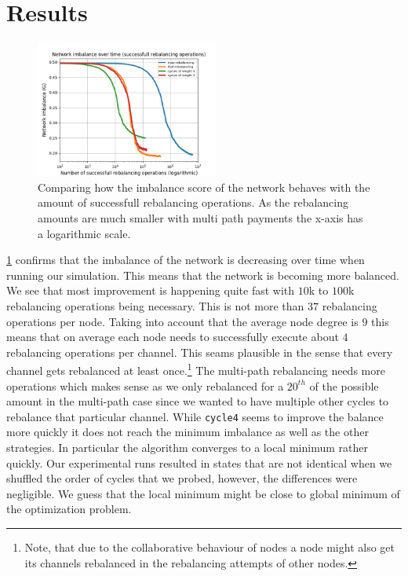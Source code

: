 \documentclass[conference]{IEEEtran}
\begin{document}
\section{Results}
\label{sec:results}

\begin{figure}
 \centering
 \includegraphics[width=6cm]{code/vs/fig/imba_vs_steps.png}
 \caption{Comparing how the imbalance score of the network behaves with the amount of successfull rebalancing operations. As the rebalancing amounts are much smaller with multi path payments the x-axis has a logarithmic scale.}
 \label{fig:imbalancehovertime}
\end{figure}

\cref{fig:imbalancehovertime} confirms that the imbalance of the network is decreasing over time when running our simulation.
This means that the network is becoming more balanced.
We see that most improvement is happening quite fast with $10$k to $100$k rebalancing operations being necessary.
This is not more than $37$ rebalancing operations per node.
Taking into account that the average node degree is $9$ this means that on average each node needs to successfully execute about $4$ rebalancing operations per channel.  
This seams plausible in the sense that every channel gets rebalanced at least once.\footnote{Note, that due to the collaborative behaviour of nodes a node might also get its channels rebalanced in the rebalancing attempts of other nodes.}
The multi-path rebalancing needs more operations which makes sense as we only rebalanced for a $20^{th}$ of the possible amount in the multi-path case since we wanted to have multiple other cycles to rebalance that particular channel.
While \texttt{cycle4} seems to improve the balance more quickly it does not reach the minimum imbalance as well as the other strategies.
In particular the algorithm converges to a local minimum rather quickly.
Our experimental runs resulted in states that are not identical when we shuffled the order of cycles that we probed, however, the differences were negligible. 
We guess that the local minimum might be close to global minimum of the optimization problem.
\end{document}
